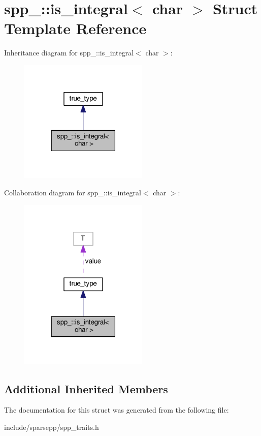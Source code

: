 \hypertarget{structspp___1_1is__integral_3_01char_01_4}{}\section{spp\+\_\+\+:\+:is\+\_\+integral$<$ char $>$ Struct Template Reference}
\label{structspp___1_1is__integral_3_01char_01_4}


Inheritance diagram for spp\+\_\+\+:\+:is\+\_\+integral$<$ char $>$\+:\nopagebreak
\begin{figure}[H]
\begin{center}
\leavevmode
\includegraphics[width=174pt]{structspp___1_1is__integral_3_01char_01_4__inherit__graph}
\end{center}
\end{figure}


Collaboration diagram for spp\+\_\+\+:\+:is\+\_\+integral$<$ char $>$\+:\nopagebreak
\begin{figure}[H]
\begin{center}
\leavevmode
\includegraphics[width=174pt]{structspp___1_1is__integral_3_01char_01_4__coll__graph}
\end{center}
\end{figure}
\subsection*{Additional Inherited Members}


The documentation for this struct was generated from the following file\+:\begin{DoxyCompactItemize}
\item 
include/sparsepp/spp\+\_\+traits.\+h\end{DoxyCompactItemize}
